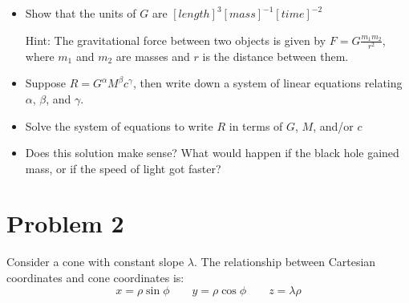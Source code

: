 \documentclass{article}
\begin{document}
\begin{itemize}
    \item Show that the units of $G$ are $[length]^3 [mass]^{-1} [time]^{-2}$
    
    Hint: The gravitational force between two objects is given by $F = G\frac{m_1 m_2}{r^2}$, where $m_1$ and $m_2$ are masses and $r$ is the distance between them.
    \item Suppose $R = G^{\alpha} M^{\beta} c^{\gamma}$, then write down a system of linear equations relating $\alpha$, $\beta$, and $\gamma$. 
    \item Solve the system of equations to write $R$ in terms of $G$, $M$, and/or $c$
    \item Does this solution make sense? What would happen if the black hole gained mass, or if the speed of light got faster?
\end{itemize}

\newpage

\section*{Problem 2}

Consider a cone with constant slope $\lambda$. The relationship between Cartesian coordinates and cone coordinates is:
$$
x=\rho \sin\phi
\quad \quad 
y=\rho \cos\phi
\quad \quad
z=\lambda\rho
$$
\end{document}
